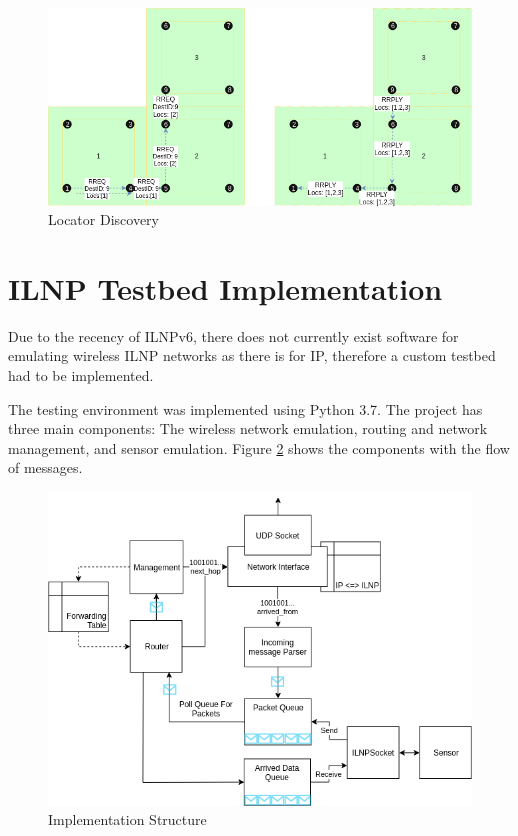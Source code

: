 \documentclass[12pt]{article}
\begin{document}
\begin{figure}[!ht]
	\centering
	\includegraphics[width=0.8\linewidth]{images/external}
	\caption{Locator Discovery}
	\label{fig:external}
\end{figure}

\FloatBarrier
\pagebreak
\part{ILNP Testbed Implementation}

Due to the recency of ILNPv6, there does not currently exist software for emulating wireless ILNP networks as there is for IP, therefore a custom testbed had to be implemented.  

The testing environment was implemented using Python 3.7. The project has three main components: The wireless network emulation, routing and network management, and sensor emulation. Figure \ref{fig:struc} shows the components with the flow of messages.

\begin{figure}[!ht]
	\centering
	\includegraphics[width=\linewidth]{images/struc}
	\caption{Implementation Structure}
	\label{fig:struc}
\end{figure}
\end{document}
